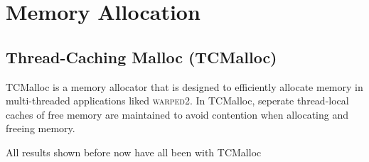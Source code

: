 \documentclass[11pt]{book}
\begin{document}
\section{Memory Allocation}

\subsection{Thread-Caching Malloc (TCMalloc)}

TCMalloc is a memory allocator that is designed to efficiently allocate memory in
multi-threaded applications liked \textsc{warped2}. In TCMalloc, seperate thread-local
caches of free memory are maintained to avoid contention when allocating and freeing memory.

All results shown before now have all been with TCMalloc
\end{document}
